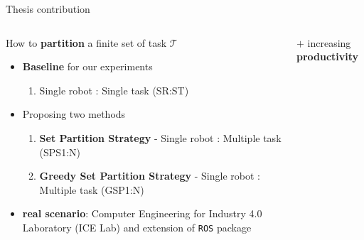    \begin{frame}[fragile]{Thesis contribution}
        \begin{columns}
            \begin{column}{.7\textwidth}
            
            How to {\bf partition} a finite set of task $\mathcal{T}$
            
            \begin{itemize}
                
                \item {\bf Baseline} for our experiments

                \begin{enumerate}
                    \item Single robot : Single task (SR:ST)
                \end{enumerate}

                \item Proposing two methods
                \begin{enumerate}
                    \item {\bf Set Partition Strategy} - Single robot : Multiple task (SPS1:N)
                    \item {\bf Greedy Set Partition Strategy} - Single robot : Multiple task (GSP1:N)
                \end{enumerate}
                \item {\bf real scenario}: Computer Engineering for Industry 4.0 Laboratory (ICE Lab) and  extension of  \texttt{ROS}  package
            \end{itemize}
            \end{column}
            \begin{column}{.4\textwidth}
                $+$ increasing {\bf productivity}
                

\end{column}
\end{columns}
\end{frame}
